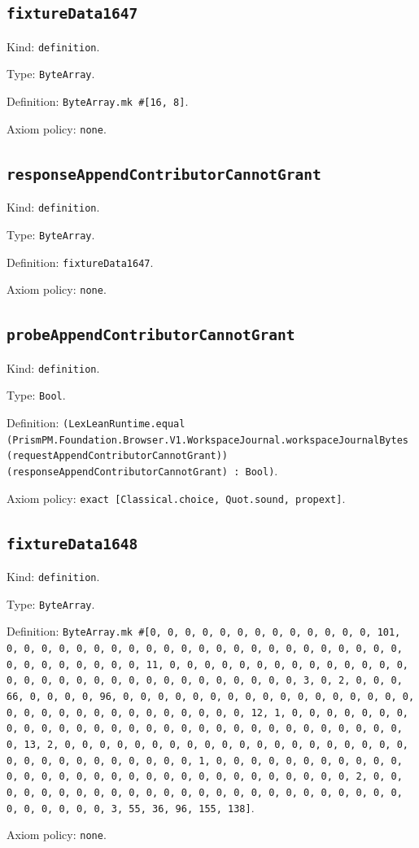 \documentclass[11pt]{article}
\begin{document}
\subsection*{\texttt{fixtureData1647}}
\noindent Kind: \texttt{definition}.\par
\noindent Type: \texttt{ByteArray}.\par
\noindent Definition: \texttt{ByteArray.mk \#[16, 8]}.\par
\noindent Axiom policy: \texttt{none}.\par
\subsection*{\texttt{responseAppendContributorCannotGrant}}
\noindent Kind: \texttt{definition}.\par
\noindent Type: \texttt{ByteArray}.\par
\noindent Definition: \texttt{fixtureData1647}.\par
\noindent Axiom policy: \texttt{none}.\par
\subsection*{\texttt{probeAppendContributorCannotGrant}}
\noindent Kind: \texttt{definition}.\par
\noindent Type: \texttt{Bool}.\par
\noindent Definition: \texttt{(LexLeanRuntime.equal (PrismPM.Foundation.Browser.V1.WorkspaceJournal.workspaceJournalBytes (requestAppendContributorCannotGrant)) (responseAppendContributorCannotGrant) : Bool)}.\par
\noindent Axiom policy: \texttt{exact [Classical.choice, Quot.sound, propext]}.\par
\subsection*{\texttt{fixtureData1648}}
\noindent Kind: \texttt{definition}.\par
\noindent Type: \texttt{ByteArray}.\par
\noindent Definition: \texttt{ByteArray.mk \#[0, 0, 0, 0, 0, 0, 0, 0, 0, 0, 0, 0, 0, 101, 0, 0, 0, 0, 0, 0, 0, 0, 0, 0, 0, 0, 0, 0, 0, 0, 0, 0, 0, 0, 0, 0, 0, 0, 0, 0, 0, 0, 0, 0, 0, 11, 0, 0, 0, 0, 0, 0, 0, 0, 0, 0, 0, 0, 0, 0, 0, 0, 0, 0, 0, 0, 0, 0, 0, 0, 0, 0, 0, 0, 0, 0, 0, 3, 0, 2, 0, 0, 0, 66, 0, 0, 0, 0, 96, 0, 0, 0, 0, 0, 0, 0, 0, 0, 0, 0, 0, 0, 0, 0, 0, 0, 0, 0, 0, 0, 0, 0, 0, 0, 0, 0, 0, 0, 0, 0, 12, 1, 0, 0, 0, 0, 0, 0, 0, 0, 0, 0, 0, 0, 0, 0, 0, 0, 0, 0, 0, 0, 0, 0, 0, 0, 0, 0, 0, 0, 0, 0, 0, 13, 2, 0, 0, 0, 0, 0, 0, 0, 0, 0, 0, 0, 0, 0, 0, 0, 0, 0, 0, 0, 0, 0, 0, 0, 0, 0, 0, 0, 0, 0, 0, 0, 1, 0, 0, 0, 0, 0, 0, 0, 0, 0, 0, 0, 0, 0, 0, 0, 0, 0, 0, 0, 0, 0, 0, 0, 0, 0, 0, 0, 0, 0, 0, 0, 2, 0, 0, 0, 0, 0, 0, 0, 0, 0, 0, 0, 0, 0, 0, 0, 0, 0, 0, 0, 0, 0, 0, 0, 0, 0, 0, 0, 0, 0, 0, 0, 3, 55, 36, 96, 155, 138]}.\par
\noindent Axiom policy: \texttt{none}.\par
\end{document}
